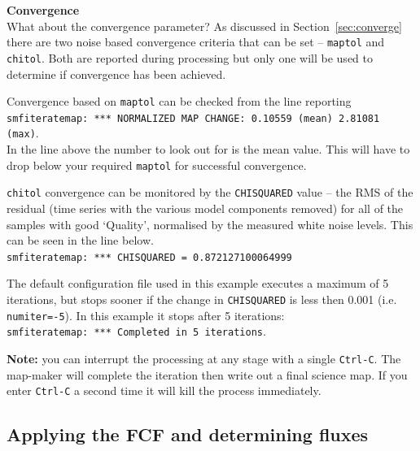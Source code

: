 \documentclass[twoside,11pt]{article}
\newcommand{\xlabel}[1]{}
\renewcommand{\_}{\texttt{\symbol{95}}}
\begin{document}
\textbf{Convergence}\\
What about the convergence parameter? As discussed in
Section~\ref{sec:converge} there are two noise based convergence
criteria that can be set -- \texttt{maptol} and \texttt{chitol}. Both
are reported during processing but only one will be used to determine
if convergence has been achieved.

Convergence based on \texttt{maptol} can be checked from the line
reporting\\
\hspace{5mm}\texttt{smf\_iteratemap: *** NORMALIZED MAP
CHANGE: 0.10559 (mean) 2.81081 (max)}.\\
In the line above the number to look out for is the mean value. This
will have to drop below your required \texttt{maptol} for successful
convergence.

\texttt{chitol} convergence can be monitored by the
\texttt{CHISQUARED} value -- the RMS of the residual (time series with
the various model components removed) for all of the samples with good
`Quality', normalised by the measured white noise levels. This can be
seen in the line below.\\
\hspace{0.5cm}\texttt{smf\_iteratemap: *** CHISQUARED = 0.872127100064999}


The default configuration file used in this example executes a maximum
of 5 iterations, but stops sooner if the change in \texttt{CHISQUARED}
is less then 0.001 (i.e. \texttt{numiter=-5}). In this example it
stops after 5 iterations: \\
\texttt{smf\_iteratemap: *** Completed in 5 iterations}.


\textbf{Note:} you can interrupt the processing at any stage with a
single \texttt{Ctrl-C}. The map-maker will complete the iteration then write
out a final science map. If you enter \texttt{Ctrl-C} a second time it will
kill the process immediately.


\subsection{\xlabel{apply_fcf}Applying the FCF and determining fluxes}
\label{sec:cmult}
\end{document}
